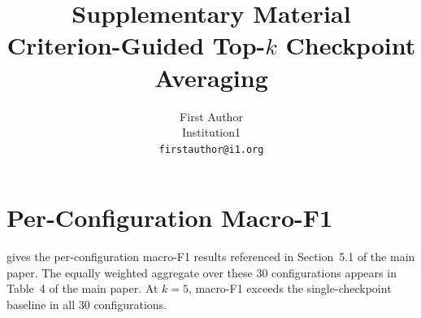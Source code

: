 \documentclass[10pt,twocolumn,letterpaper]{article}
\title{Supplementary Material\\
Criterion-Guided Top-$k$ Checkpoint Averaging}
\author{First Author\\Institution1\\{\tt\small firstauthor@i1.org}}
\begin{document}
\maketitle

\section{Per-Configuration Macro-F1}

 gives the per-configuration macro-F1 results referenced in
Section~5.1 of the main paper. The equally weighted aggregate over these 30
configurations appears in Table~4 of the main paper. At $k{=}5$, macro-F1
exceeds the single-checkpoint baseline in all 30 configurations.


\end{document}
